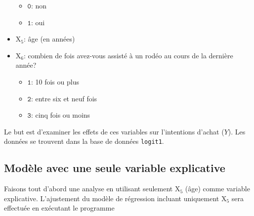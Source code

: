 \documentclass[
  11pt,
  letterpaper,
]{scrbook}
\providecommand{\tightlist}{%
  \setlength{\itemsep}{0pt}\setlength{\parskip}{0pt}}\usepackage{longtable,booktabs,array}
\theoremstyle{definition}
\theoremstyle{remark}
\begin{document}
\begin{itemize}
  \begin{itemize}
  \tightlist
  \item
    \(\texttt{0}\): non
  \item
    \(\texttt{1}\): oui
  \end{itemize}
\item
  \(\mathrm{X}_5\): âge (en années)
\item
  \(\mathrm{X}_6\): combien de fois avez-vous assisté à un rodéo au
  cours de la dernière année?

  \begin{itemize}
  \tightlist
  \item
    \(\texttt{1}\): 10 fois ou plus
  \item
    \(\texttt{2}\): entre six et neuf fois
  \item
    \(\texttt{3}\): cinq fois ou moins
  \end{itemize}
\end{itemize}

Le but est d'examiner les effets de ces variables sur l'intentions
d'achat (\(Y\)). Les données se trouvent dans la base de données
\texttt{logit1}.

\hypertarget{moduxe8le-avec-une-seule-variable-explicative}{%
\subsection{Modèle avec une seule variable
explicative}\label{moduxe8le-avec-une-seule-variable-explicative}}

Faisons tout d'abord une analyse en utilisant seulement \(\mathrm{X}_5\)
(âge) comme variable explicative. L'ajustement du modèle de régression
incluant uniquement \(\mathrm{X}_5\) sera effectuée en exécutant le
programme
\end{document}
